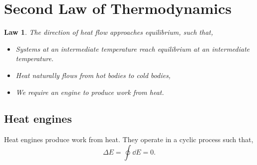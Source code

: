 \documentclass{book}
\newtheorem{law}{Law}
\begin{document}
\section{Second Law of Thermodynamics}
\begin{law}
	The direction of heat flow approaches equilibrium, such that,
	\begin{itemize}
		\item Systems at an intermediate temperature reach equilibrium at an intermediate temperature.
		\item Heat naturally flows from hot bodies to cold bodies,
		\item We require an engine to produce work from heat.
	\end{itemize}
\end{law}
\subsection{Heat engines}

Heat engines produce work from heat. They operate in a cyclic process such that,
\begin{equation}
	\Delta E = \oint\dd{E} = 0.
\end{equation}
\end{document}
